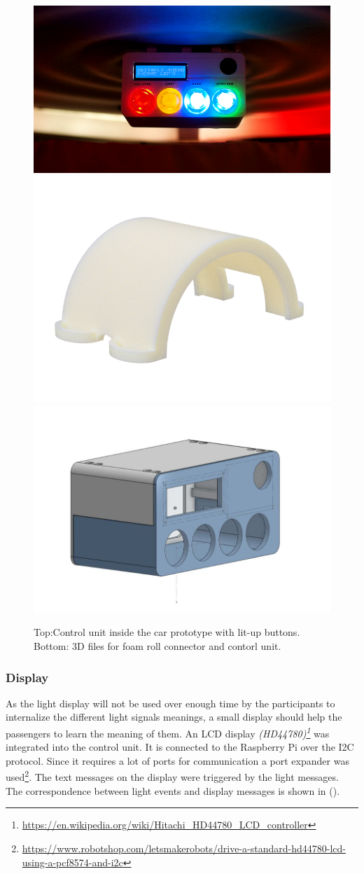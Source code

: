 \begin{figure}
\includegraphics[width=\textwidth]{fig/monitor.png}\hfill\includegraphics[height=0.36\textwidth]{fig/KabelH.png}\hfill\includegraphics[height=0.36\textwidth]{fig/controlBox2.JPG}
\caption[Control Unit]{Top:Control unit inside the car prototype with lit-up buttons. Bottom: 3D files for foam roll connector and contorl unit.}
\label{fig:boxes}
\end{figure}

\subsubsection{Display}
\label{ssec:display}
As the light display will not be used over enough time by the participants to internalize the different light signals meanings, a small display should help the passengers to learn the meaning of them. An LCD display \emph{(HD44780)\footnote{\url{https://en.wikipedia.org/wiki/Hitachi_HD44780_LCD_controller}}} was integrated into the control unit. It is connected to the Raspberry Pi over the I2C protocol. Since it requires a lot of ports for communication 
a port expander was used\footnote{\url{https://www.robotshop.com/letsmakerobots/drive-a-standard-hd44780-lcd-using-a-pcf8574-and-i2c}}. The text messages on the display were triggered by the light messages. The correspondence between light events and display messages is shown in (\emph{}).

